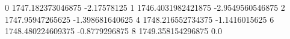 0 1747.182373046875 -2.17578125
1 1746.4031982421875 -2.9549560546875
2 1747.95947265625 -1.398681640625
4 1748.216552734375 -1.1416015625
6 1748.480224609375 -0.8779296875
8 1749.358154296875 0.0
